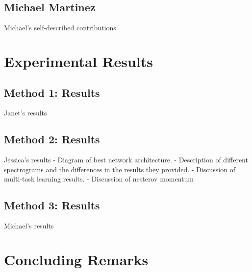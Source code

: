 \documentclass{article}
\begin{document}
\subsection{Michael Martinez}
Michael's self-described contributions

\section{Experimental Results}
\subsection{Method 1: Results}
Janet's results
\subsection{Method 2: Results}
Jessica's results
- Diagram of best network architecture.
- Description of different spectrograms and the differences in the results they provided.
- Discussion of multi-task learning results.
- Discussion of nesterov momentum
\subsection{Method 3: Results}
Michael's results

\section{Concluding Remarks}





\newpage
\end{document}
